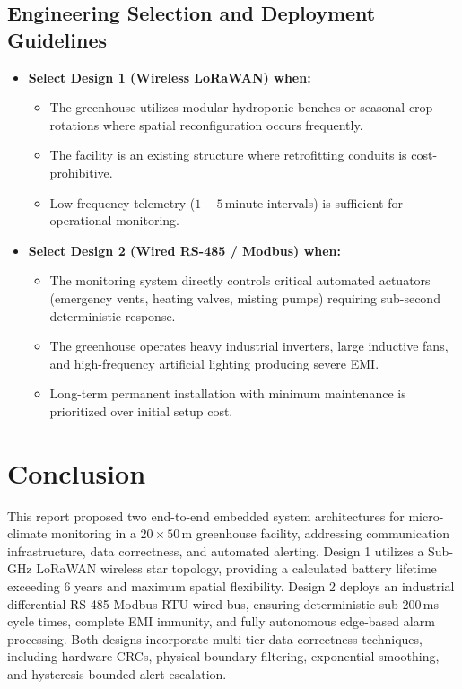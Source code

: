 \documentclass[12pt]{article}
\begin{document}
\subsection{Engineering Selection and Deployment Guidelines}
\begin{itemize}
    \item \textbf{Select Design 1 (Wireless LoRaWAN) when:}
    \begin{itemize}
        \item The greenhouse utilizes modular hydroponic benches or seasonal crop rotations where spatial reconfiguration occurs frequently.
        \item The facility is an existing structure where retrofitting conduits is cost-prohibitive.
        \item Low-frequency telemetry ($1-5$\,minute intervals) is sufficient for operational monitoring.
    \end{itemize}
    \item \textbf{Select Design 2 (Wired RS-485 / Modbus) when:}
    \begin{itemize}
        \item The monitoring system directly controls critical automated actuators (emergency vents, heating valves, misting pumps) requiring sub-second deterministic response.
        \item The greenhouse operates heavy industrial inverters, large inductive fans, and high-frequency artificial lighting producing severe EMI.
        \item Long-term permanent installation with minimum maintenance is prioritized over initial setup cost.
    \end{itemize}
\end{itemize}

\section{Conclusion}
This report proposed two end-to-end embedded system architectures for micro-climate monitoring in a $20 \times 50$\,m greenhouse facility, addressing communication infrastructure, data correctness, and automated alerting. Design 1 utilizes a Sub-GHz LoRaWAN wireless star topology, providing a calculated battery lifetime exceeding 6 years and maximum spatial flexibility. Design 2 deploys an industrial differential RS-485 Modbus RTU wired bus, ensuring deterministic sub-200\,ms cycle times, complete EMI immunity, and fully autonomous edge-based alarm processing. Both designs incorporate multi-tier data correctness techniques, including hardware CRCs, physical boundary filtering, exponential smoothing, and hysteresis-bounded alert escalation.
\end{document}
